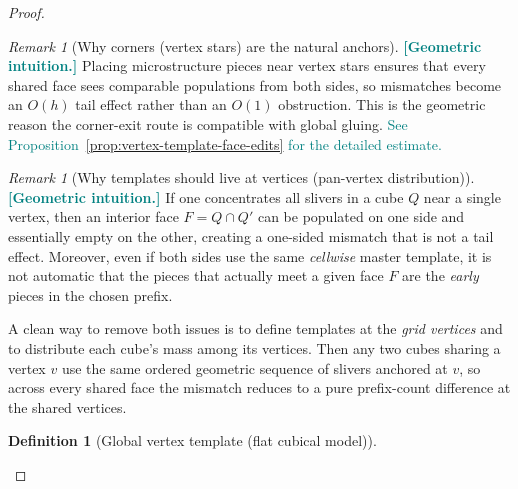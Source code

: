 \documentclass[11pt]{article}
\newcommand{\REVMZ}[1]{\textcolor{teal}{#1}}  %
\numberwithin{equation}{section}  %
\theoremstyle{plain}
\theoremstyle{definition}
\newtheorem{definition}[theorem]{Definition}
\theoremstyle{remark}
\newtheorem{remark}[theorem]{Remark}
\begin{document}
\begin{proof}
\begin{remark}[Why corners (vertex stars) are the natural anchors]\label{rem:why-corners}
\REVMZ{\textbf{[Geometric intuition.]}}
Placing microstructure pieces near vertex stars ensures that every shared face sees comparable populations from both sides,
so mismatches become an $O(h)$ tail effect rather than an $O(1)$ obstruction.  This is the geometric reason the
corner-exit route is compatible with global gluing.
\REVMZ{See Proposition~\ref{prop:vertex-template-face-edits} for the detailed estimate.}
\end{remark}

\begin{remark}[Why templates should live at vertices (pan-vertex distribution)]
\label{rem:sharp-cube-why}
\REVMZ{\textbf{[Geometric intuition.]}}
If one concentrates all slivers in a cube $Q$ near a single vertex, then an interior face $F=Q\cap Q'$ can be populated on one side and essentially empty on the other,
creating a one-sided mismatch that is not a tail effect.
Moreover, even if both sides use the same \emph{cellwise} master template, it is not automatic that the pieces that actually meet a given face $F$ are the \emph{early}
pieces in the chosen prefix.

\smallskip\noindent
A clean way to remove both issues is to define templates at the \emph{grid vertices} and to distribute each cube's mass among its vertices.
Then any two cubes sharing a vertex $v$ use the same ordered geometric sequence of slivers anchored at $v$, so across every shared face the mismatch reduces to a
pure prefix-count difference at the shared vertices.
\end{remark}

\begin{definition}[Global vertex template (flat cubical model)]\label{def:vertex-template}


\end{definition}
\end{proof}
\end{document}

